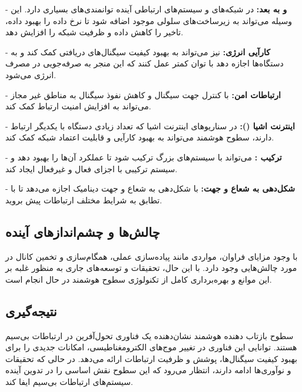 - \textbf{
	 و به بعد:
} 
 در شبکه‌های  و سیستم‌های ارتباطی آینده توانمندی‌های بسیاری دارد. این وسیله می‌تواند به زیرساخت‌های سلولی موجود اضافه شود تا نرخ داده را بهبود داده، تاخیر را کاهش داده و ظرفیت شبکه را افزایش دهد.

- \textbf{کارآیی انرژی:}  نیز می‌تواند به بهبود کیفیت سیگنال‌های دریافتی کمک کند و به دستگاه‌ها اجازه دهد با توان کمتر عمل کنند که این منجر به صرفه‌جویی در مصرف انرژی می‌شود.

- \textbf{ارتباطات امن:} با کنترل جهت سیگنال و کاهش نفوذ سیگنال به مناطق غیر مجاز می‌تواند به افزایش امنیت ارتباط کمک کند.

- \textbf{اینترنت اشیا ():} در سناریوهای اینترنت اشیا که تعداد زیادی دستگاه با یکدیگر ارتباط دارند، سطوح هوشمند می‌تواند به بهبود کارآیی و قابلیت اعتماد شبکه کمک کند.

- \textbf{ترکیب :}  می‌تواند با سیستم‌های  بزرگ ترکیب شود تا عملکرد آن‌ها را بهبود دهد و سیستم ترکیبی با اجزای فعال و غیرفعال ایجاد کند.

- \textbf{شکل‌دهی به شعاع و جهت:}  با شکل‌دهی به شعاع و جهت دینامیک اجازه می‌دهد تا با تطابق به شرایط مختلف ارتباطات پیش بروید.

\subsection{چالش‌ها و چشم‌اندازهای آینده}

با وجود مزایای فراوان، مواردی مانند پیاده‌سازی عملی، همگام‌سازی و تخمین کانال در مورد  چالش‌هایی وجود دارد. با این حال، تحقیقات و توسعه‌های جاری به منظور غلبه بر این موانع و بهره‌برداری کامل از تکنولوژی سطوح هوشمند در حال انجام است.

\subsection{نتیجه‌گیری}

سطوح بازتاب دهنده هوشمند نشان‌دهنده یک فناوری تحول‌آفرین در ارتباطات بی‌سیم هستند. توانایی این فناوری در تغییر موج‌های الکترومغناطیسی، امکانات جدیدی را برای بهبود کیفیت سیگنال‌ها، پوشش و ظرفیت ارتباطات ارائه می‌دهد. در حالی که تحقیقات و نوآوری‌ها ادامه دارند، انتظار می‌رود که این سطوح نقش اساسی را در تدوین آینده سیستم‌های ارتباطات بی‌سیم ایفا کند.

\newpage
‌